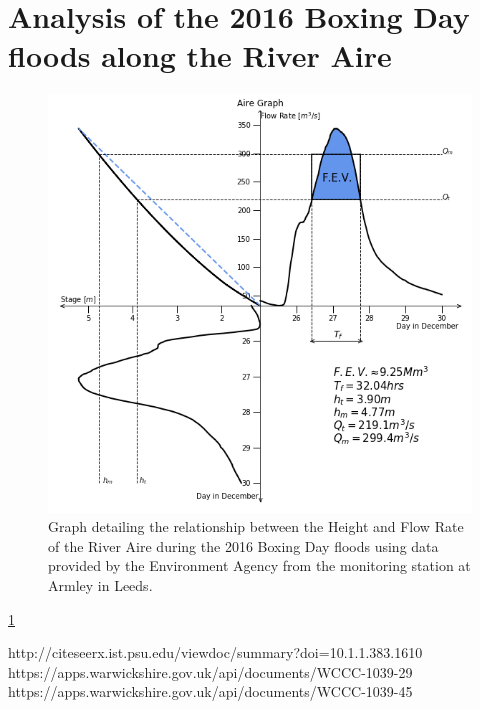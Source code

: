 \documentclass[11 pt, a4paper]{article}
\begin{document}
\newpage
\section{Analysis of the 2016 Boxing Day floods along the River Aire}
\begin{figure}[h!]
\centering
\includegraphics[width=125mm]{Aire-Quadrant_Graph.png}
\caption{Graph detailing the relationship between the Height and Flow Rate of the River Aire during the 2016 Boxing Day floods using data provided by the Environment Agency from the  monitoring station at Armley in Leeds.}
  \label{fig:Aire Graph}
\end{figure}

\ref{fig:Aire Graph}

\begin{thebibliography}{}
 http://citeseerx.ist.psu.edu/viewdoc/summary?doi=10.1.1.383.1610
 https://apps.warwickshire.gov.uk/api/documents/WCCC-1039-29
 https://apps.warwickshire.gov.uk/api/documents/WCCC-1039-45
\end{thebibliography}

\newpage
\appendix
\end{document}
